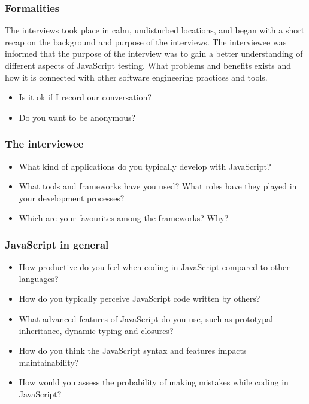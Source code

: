 \documentclass[11pt]{article}
\begin{document}
\subsubsection{Formalities}
The interviews took place in calm, undisturbed locations, and began with a short recap on the background and purpose of the interviews. The interviewee was informed that the purpose of the interview was to gain a better understanding of different aspects of JavaScript testing. What problems and benefits exists and how it is connected with other software engineering practices and tools.

\begin{itemize}
\item Is it ok if I record our conversation?
\item Do you want to be anonymous?
\end{itemize}

\subsubsection{The interviewee}
\begin{itemize}
\item What kind of applications do you typically develop with JavaScript?
\item What tools and frameworks have you used? What roles have they played in your development processes?
\item Which are your favourites among the frameworks? Why?
\end{itemize}

\subsubsection{JavaScript in general}
\begin{itemize}
\item How productive do you feel when coding in JavaScript compared to other languages?
\item How do you typically perceive JavaScript code written by others?
\item What advanced features of JavaScript do you use, such as prototypal inheritance, dynamic typing and closures?
\item How do you think the JavaScript syntax and features impacts maintainability?
\item How would you assess the probability of making mistakes while coding in JavaScript?
\end{itemize}
\end{document}
